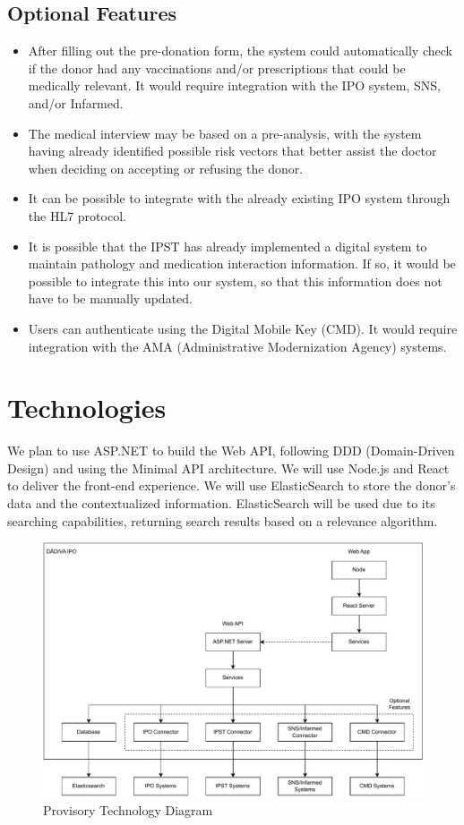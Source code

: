 \documentclass[a4paper,11pt]{article}
\begin{document}
\subsection{Optional Features}
\begin{itemize}
	\item After filling out the pre-donation form, the system could automatically check if the donor had any vaccinations and/or prescriptions that could be medically relevant. It would require integration with the IPO system, SNS, and/or Infarmed.
	\item The medical interview may be based on a pre-analysis, with the system having already identified possible risk vectors that better assist the doctor when deciding on accepting or refusing the donor.
	\item It can be possible to integrate with the already existing IPO system through the HL7 protocol. \cite{hl7}
	\item It is possible that the IPST has already implemented a digital system to maintain pathology and medication interaction information. If so, it would be possible to integrate this into our system, so that this information does not have to be manually updated.
	\item Users can authenticate using the Digital Mobile Key (CMD). It would require integration with the AMA (Administrative Modernization Agency) systems.
\end{itemize}

\section{Technologies}
We plan to use ASP.NET \cite{aspnet} to build the Web API, following DDD (Domain-Driven Design) and using the Minimal API \cite{minimalAPI} architecture. We will use Node.js \cite{nodejs} and React \cite{react} to deliver the front-end experience. We will use ElasticSearch \cite{elasticsearch} to store the donor’s data and the contextualized information. ElasticSearch will be used due to its searching capabilities, returning search results based on a relevance algorithm.

\begin{figure}[h]
\centering
\includegraphics[width=\textwidth,height=\textheight,keepaspectratio]{tech_diagram}
\caption{Provisory Technology Diagram}
\end{figure}
\end{document}
